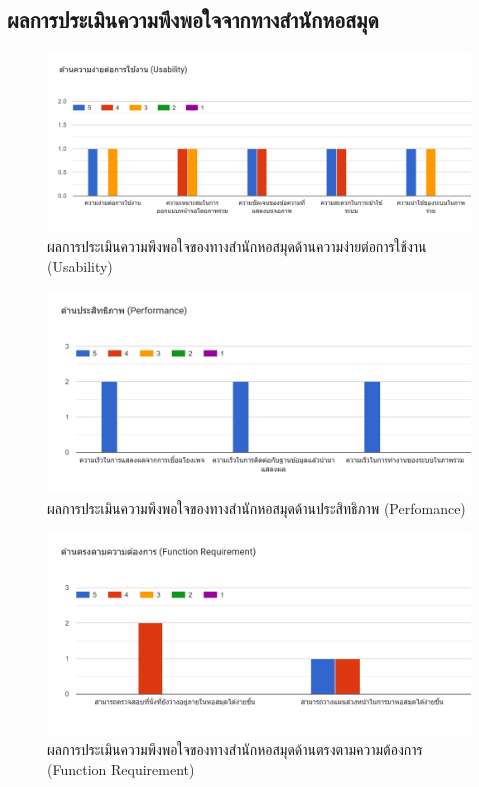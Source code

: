 \subsection{ผลการประเมินความพึงพอใจจากทางสำนักหอสมุด}
\begin{figure}[ht]
    \centering
    \includegraphics[scale=0.6]{images/cmul-u.png}
    \caption[cmul-u]{ผลการประเมินความพึงพอใจของทางสำนักหอสมุดด้านความง่ายต่อการใช้งาน (Usability)}
    \label{fig:cmul-u}
\end{figure}
\begin{figure}[ht]
    \centering
    \includegraphics[scale=0.6]{images/cmul-p.png}
    \caption[cmul-p]{ผลการประเมินความพึงพอใจของทางสำนักหอสมุดด้านประสิทธิภาพ (Perfomance)}
    \label{fig:cmul-p}
\end{figure}
\begin{figure}[ht]
    \centering
    \includegraphics[scale=0.6]{images/cmul-f.png}
    \caption[cmul-f]{ผลการประเมินความพึงพอใจของทางสำนักหอสมุดด้านตรงตามความต้องการ (Function Requirement)}
    \label{fig:cmul-f}
\end{figure}


